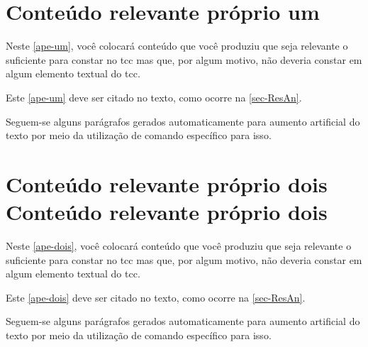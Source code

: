 \begin{apendicesenv}

\partapendices

\chapter{Conteúdo relevante próprio um} %
\label{ape-um}

Neste \autoref{ape-um}, você colocará conteúdo que você produziu que seja relevante o suficiente para constar no \ac{tcc} mas que, por algum motivo, não deveria constar em algum elemento textual do \ac{tcc}.

Este \autoref{ape-um} deve ser citado no texto, como ocorre na \autoref{sec-ResAn}.

Seguem-se alguns parágrafos gerados automaticamente para aumento artificial do texto por meio da utilização de comando específico para isso.

\lipsum[23-25]

\chapter{Conteúdo relevante próprio dois Conteúdo relevante próprio dois} %
\label{ape-dois}

Neste \autoref{ape-dois}, você colocará conteúdo que você produziu que seja relevante o suficiente para constar no \ac{tcc} mas que, por algum motivo, não deveria constar em algum elemento textual do \ac{tcc}.

Este \autoref{ape-dois} deve ser citado no texto, como ocorre na \autoref{sec-ResAn}.

Seguem-se alguns parágrafos gerados automaticamente para aumento artificial do texto por meio da utilização de comando específico para isso.

\lipsum[23-30]

\end{apendicesenv}

